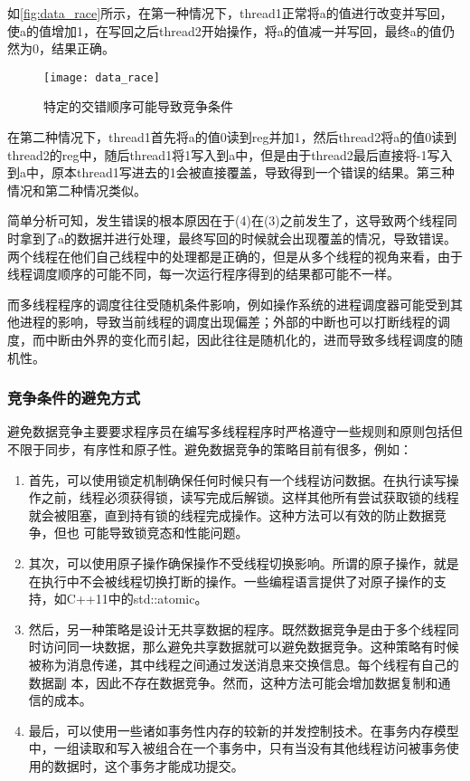 如\autoref{fig:data_race}所示，在第一种情况下，thread1正常将a的值进行改变并写回，使a的值增加1，在写回之后thread2开始操作，将a的值减一并写回，最终a的值仍然为0，结果正确。

\begin{figure}[ht]
    \centering
    \texttt{[image: data\_race]}
    \caption{\label{fig:data_race}特定的交错顺序可能导致竞争条件}
\end{figure}


在第二种情况下，thread1首先将a的值0读到reg并加1，然后thread2将a的值0读到thread2的reg中，随后thread1将1写入到a中，但是由于thread2最后直接将-1写入到a中，原本thread1写进去的1会被直接覆盖，导致得到一个错误的结果。第三种情况和第二种情况类似。

简单分析可知，发生错误的根本原因在于(4)在(3)之前发生了，这导致两个线程同时拿到了a的数据并进行处理，最终写回的时候就会出现覆盖的情况，导致错误。两个线程在他们自己线程中的处理都是正确的，但是从多个线程的视角来看，由于线程调度顺序的可能不同，每一次运行程序得到的结果都可能不一样。

而多线程程序的调度往往受随机条件影响，例如操作系统的进程调度器可能受到其他进程的影响，导致当前线程的调度出现偏差；外部的中断也可以打断线程的调度，而中断由外界的变化而引起，因此往往是随机化的，进而导致多线程调度的随机性。

\subsubsection{竞争条件的避免方式}

避免数据竞争主要要求程序员在编写多线程程序时严格遵守一些规则和原则包括但不限于同步，有序性和原子性。避免数据竞争的策略目前有很多，例如：

\begin{enumerate}
\item 首先，可以使用锁定机制确保任何时候只有一个线程访问数据。在执行读写操作之前，线程必须获得锁，读写完成后解锁。这样其他所有尝试获取锁的线程就会被阻塞，直到持有锁的线程完成操作。这种方法可以有效的防止数据竞争，但也 可能导致锁竞态和性能问题。
\item 其次，可以使用原子操作确保操作不受线程切换影响。所谓的原子操作，就是在执行中不会被线程切换打断的操作。一些编程语言提供了对原子操作的支持，如C++11中的std::atomic。
\item 然后，另一种策略是设计无共享数据的程序。既然数据竞争是由于多个线程同时访问同一块数据，那么避免共享数据就可以避免数据竞争。这种策略有时候被称为消息传递，其中线程之间通过发送消息来交换信息。每个线程有自己的数据副 本，因此不存在数据竞争。然而，这种方法可能会增加数据复制和通信的成本。
\item 最后，可以使用一些诸如事务性内存的较新的并发控制技术。在事务内存模型中，一组读取和写入被组合在一个事务中，只有当没有其他线程访问被事务使用的数据时，这个事务才能成功提交。
\end{enumerate}

